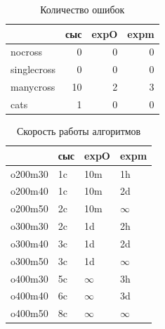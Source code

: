 \documentclass{matmex-diploma-custom}
\begin{document}
\begin{table}[h]
  \centering
  \begin{tabular}{lrrr}
    \hline
    & сыс & expO & expm \\
    \hline
    nocross & 0 & 0 & 0 \\
    singlecross & 0 & 0 & 0 \\
    manycross & 10 & 2 & 3 \\
    cats & 1 & 0 & 0 \\
    \hline
  \end{tabular}
  \caption{Количество ошибок}
  \label{tab:perf}
\end{table}

\begin{table}[h]
  \centering
  \begin{tabular}{llll}
    \hline
    & сыс & expO & expm \\
    \hline
    o200m30 & 1c & 10m & 1h \\
    o200m40 & 1c & 10m & 2d \\
    o200m50 & 2c & 10m & $\infty$ \\
    o300m30 & 2c & 1d & 2h \\
    o300m40 & 3c & 1d & 2d \\
    o300m50 & 3c & 1d & $\infty$ \\
    o400m30 & 5c & $\infty$ & 3h \\
    o400m40 & 6c & $\infty$ & 3d \\
    o400m50 & 8c & $\infty$ & $\infty$ \\
    \hline
  \end{tabular}

  \caption{Скорость работы алгоритмов}
  \label{tab:qual}
\end{table}

\end{document}
